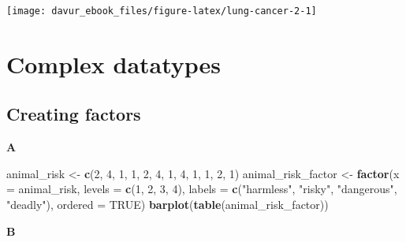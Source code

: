 \documentclass[]{book}
\newenvironment{Shaded}{\begin{snugshade}}{\end{snugshade}}
\newcommand{\DataTypeTok}[1]{\textcolor[rgb]{0.13,0.29,0.53}{#1}}
\newcommand{\DecValTok}[1]{\textcolor[rgb]{0.00,0.00,0.81}{#1}}
\newcommand{\KeywordTok}[1]{\textcolor[rgb]{0.13,0.29,0.53}{\textbf{#1}}}
\newcommand{\NormalTok}[1]{#1}
\newcommand{\OtherTok}[1]{\textcolor[rgb]{0.56,0.35,0.01}{#1}}
\newcommand{\StringTok}[1]{\textcolor[rgb]{0.31,0.60,0.02}{#1}}
\begin{document}
\begin{center}\texttt{[image: davur\_ebook\_files/figure-latex/lung-cancer-2-1]} \end{center}

\hypertarget{complex-datatypes-1}{%
\section{Complex datatypes}\label{complex-datatypes-1}}

\hypertarget{creating-factors-1}{%
\subsection{Creating factors}\label{creating-factors-1}}

\textbf{A}

\begin{Shaded}
\begin{Highlighting}[]
\NormalTok{animal_risk <-}\StringTok{ }\KeywordTok{c}\NormalTok{(}\DecValTok{2}\NormalTok{, }\DecValTok{4}\NormalTok{, }\DecValTok{1}\NormalTok{, }\DecValTok{1}\NormalTok{, }\DecValTok{2}\NormalTok{, }\DecValTok{4}\NormalTok{, }\DecValTok{1}\NormalTok{, }\DecValTok{4}\NormalTok{, }\DecValTok{1}\NormalTok{, }\DecValTok{1}\NormalTok{, }\DecValTok{2}\NormalTok{, }\DecValTok{1}\NormalTok{)}
\NormalTok{animal_risk_factor <-}\StringTok{ }\KeywordTok{factor}\NormalTok{(}\DataTypeTok{x =}\NormalTok{ animal_risk,}
                             \DataTypeTok{levels =} \KeywordTok{c}\NormalTok{(}\DecValTok{1}\NormalTok{, }\DecValTok{2}\NormalTok{, }\DecValTok{3}\NormalTok{, }\DecValTok{4}\NormalTok{),}
                             \DataTypeTok{labels =} \KeywordTok{c}\NormalTok{(}\StringTok{"harmless"}\NormalTok{, }\StringTok{"risky"}\NormalTok{, }\StringTok{"dangerous"}\NormalTok{, }\StringTok{"deadly"}\NormalTok{),}
                             \DataTypeTok{ordered =} \OtherTok{TRUE}\NormalTok{)}
\KeywordTok{barplot}\NormalTok{(}\KeywordTok{table}\NormalTok{(animal_risk_factor))}
\end{Highlighting}
\end{Shaded}

\textbf{B}
\end{document}
